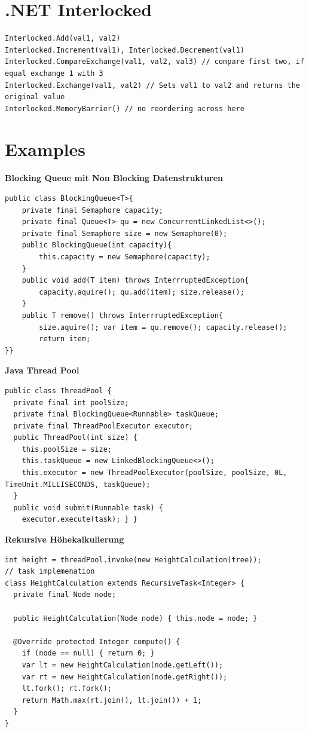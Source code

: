 \section{.NET Interlocked}
\begin{lstlisting}[style=java]
Interlocked.Add(val1, val2)
Interlocked.Increment(val1), Interlocked.Decrement(val1)
Interlocked.CompareExchange(val1, val2, val3) // compare first two, if equal exchange 1 with 3
Interlocked.Exchange(val1, val2) // Sets val1 to val2 and returns the original value
Interlocked.MemoryBarrier() // no reordering across here
\end{lstlisting}

\section{Examples}
\textbf{Blocking Queue mit Non Blocking Datenstrukturen}
\begin{lstlisting}[style=csharp]
public class BlockingQueue<T>{
	private final Semaphore capacity;
	private final Queue<T> qu = new ConcurrentLinkedList<>();
	private final Semaphore size = new Semaphore(0);
	public BlockingQueue(int capacity){
		this.capacity = new Semaphore(capacity);
	}
	public void add(T item) throws InterrruptedException{
		capacity.aquire(); qu.add(item); size.release();
	}
	public T remove() throws InterrruptedException{
		size.aquire(); var item = qu.remove(); capacity.release();
		return item;
}}
\end{lstlisting}


\textbf{Java Thread Pool}
\begin{lstlisting}[style=java]
public class ThreadPool {
  private final int poolSize;
  private final BlockingQueue<Runnable> taskQueue;
  private final ThreadPoolExecutor executor;
  public ThreadPool(int size) {
    this.poolSize = size;
    this.taskQueue = new LinkedBlockingQueue<>();
    this.executor = new ThreadPoolExecutor(poolSize, poolSize, 0L, TimeUnit.MILLISECONDS, taskQueue);
  }
  public void submit(Runnable task) {
    executor.execute(task); } }
\end{lstlisting}

\textbf{Rekursive Höhekalkulierung}
\begin{lstlisting}[style=java]
int height = threadPool.invoke(new HeightCalculation(tree));
// task implemenation
class HeightCalculation extends RecursiveTask<Integer> {
  private final Node node;

  public HeightCalculation(Node node) { this.node = node; }
  
  @Override protected Integer compute() {
    if (node == null) { return 0; }
    var lt = new HeightCalculation(node.getLeft()); 
    var rt = new HeightCalculation(node.getRight()); 
    lt.fork(); rt.fork();
    return Math.max(rt.join(), lt.join()) + 1;
  } 
}
\end{lstlisting}

